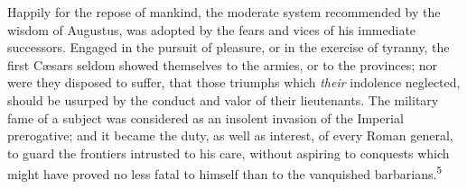 Happily for the repose of mankind, the moderate system
recommended by the wisdom of Augustus, was adopted by the fears
and vices of his immediate successors. Engaged in the pursuit of
pleasure, or in the exercise of tyranny, the first Cæsars seldom
showed themselves to the armies, or to the provinces; nor were
they disposed to suffer, that those triumphs which \textit{their}
indolence neglected, should be usurped by the conduct and valor
of their lieutenants. The military fame of a subject was
considered as an insolent invasion of the Imperial prerogative;
and it became the duty, as well as interest, of every Roman
general, to guard the frontiers intrusted to his care, without
aspiring to conquests which might have proved no less fatal to
himself than to the vanquished barbarians.\textsuperscript{5}


